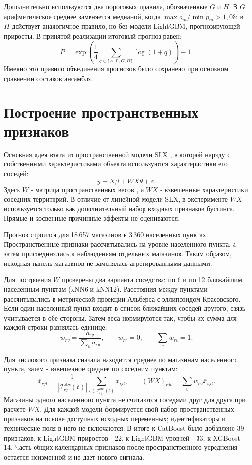 \documentclass[12pt, a4paper]{article}
\begin{document}
Дополнительно используются два пороговых правила, обозначенные $G$ и $H$. В $G$
арифметическое среднее заменяется медианой, когда $\max p_m/\min p_m>1{,}08$; в $H$ действует аналогичное правило,
но без модели LightGBM, прогнозирующей приросты. В принятой реализации итоговый прогноз равен:
\begin{equation}
P=\exp\left(\frac14\sum_{q\in\{A,L,G,H\}}\log(1+q)\right)-1.
\label{eq:meta}
\end{equation}
Именно это правило объединения прогнозов было сохранено при основном сравнении составов ансамбля.

\section*{Построение пространственных признаков}

Основная идея взята из пространственной модели SLX \cite{vega2015}, в которой наряду с собственными характеристиками объекта используются характеристики его соседей:
\begin{equation}
y=X\beta+WX\theta+\varepsilon.
\end{equation}
Здесь $W$ - матрица пространственных весов \cite{lesage2009}, а $WX$ - взвешенные характеристики соседних территорий. В отличие от линейной модели SLX,
в эксперименте $WX$ используется только как дополнительный набор входных признаков бустинга.
Прямые и косвенные причинные эффекты не оцениваются.

Прогноз строился для 18\,657 магазинов в 3\,360 населенных пунктах.
Пространственные признаки рассчитывались на уровне населенного пункта, а затем присоединялись к наблюдениям отдельных магазинов.
Таким образом, исходная панель магазинов не заменялась агрегированными данными.

Для построения $W$ проверены два варианта соседства: по 6 и по 12 ближайшим населенным пунктам (kNN6 и kNN12).
Расстояния между пунктами рассчитывались в метрической проекции Альберса с эллипсоидом Красовского.
Если один населенный пункт входит в список ближайших соседей другого, связь учитывается в обе стороны.
Затем веса нормируются так, чтобы их сумма для каждой строки равнялась единице:
\begin{equation}
w_{rv}=\frac{a_{rv}}{\sum_u a_{ru}}, \qquad w_{rr}=0,\qquad \sum_v w_{rv}=1.
\end{equation}

Для числового признака сначала находится среднее по магазинам населенного пункта, затем - взвешенное среднее по соседним пунктам:
\begin{equation}
\overline x_{rjt}=\frac{1}{|\mathcal I_{rj}^{\mathrm{obs}}(t)|}
\sum_{i\in\mathcal I_{rj}^{\mathrm{obs}}(t)}x_{ijt}, \qquad
(WX)_{rjt}=\sum_v w_{rv}\overline x_{vjt}.
\end{equation}
Магазины одного населенного пункта не считаются соседями друг для друга при расчете $WX$.
Для каждой модели формируется свой набор пространственных признаков на основе доступных исходных переменных;
идентификаторы и технические поля в него не включаются.
В итоге к CatBoost было добавлено 39 признаков, к LightGBM приростов - 22, к LightGBM уровней - 33, к XGBoost - 14.
Часть общих календарных признаков после пространственного усреднения остается неизменной и не дает нового сигнала.
\end{document}

